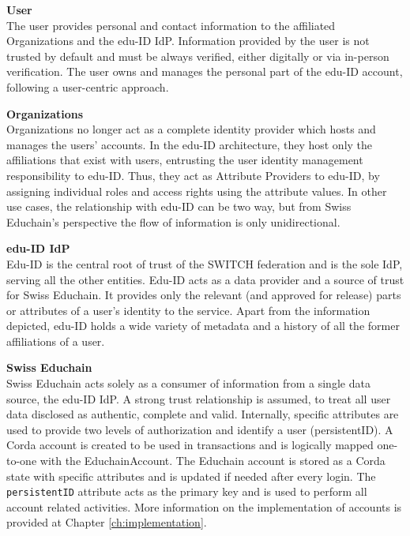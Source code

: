 \begin{description}
	\item\textbf{User} \hfill \\
	The user provides personal and contact information to the affiliated Organizations and the edu-ID IdP. Information provided by the user is not trusted by default and must be always verified, either digitally or via in-person verification. The user owns and manages the personal part of the edu-ID account, following a user-centric approach.
	\item\textbf{Organizations} \hfill \\
	Organizations no longer act as a complete identity provider which hosts and manages the users' accounts. In the edu-ID architecture, they host only the affiliations that exist with users, entrusting the user identity management responsibility to edu-ID. Thus, they act as Attribute Providers to edu-ID, by assigning individual roles and access rights using the attribute values. In other use cases, the relationship with edu-ID can be two way, but from Swiss Educhain's perspective the flow of information is only unidirectional. 
	\item\textbf{edu-ID IdP} \hfill \\
	Edu-ID is the central root of trust of the SWITCH federation and is the sole IdP, serving all the other entities. Edu-ID acts as a data provider and a source of trust for Swiss Educhain. It provides only the relevant (and approved for release) parts or attributes of a user's identity to the service. Apart from the information depicted, edu-ID holds a wide variety of metadata and a history of all the former affiliations of a user.
	\item\textbf{Swiss Educhain} \hfill \\
	Swiss Educhain acts solely as a consumer of information from a single data source, the edu-ID IdP. A strong trust relationship is assumed, to treat all user data disclosed as authentic, complete and valid. Internally, specific attributes are used to provide two levels of authorization and identify a user (persistentID). A Corda account is created to be used in transactions and is logically mapped one-to-one with the EduchainAccount. The Educhain account is stored as a Corda state with specific attributes and is updated if needed after every login. The \texttt{persistentID} attribute acts as the primary key and is used to perform all account related activities. More information on the implementation of accounts is provided at Chapter \ref{ch:implementation}.
\end{description}